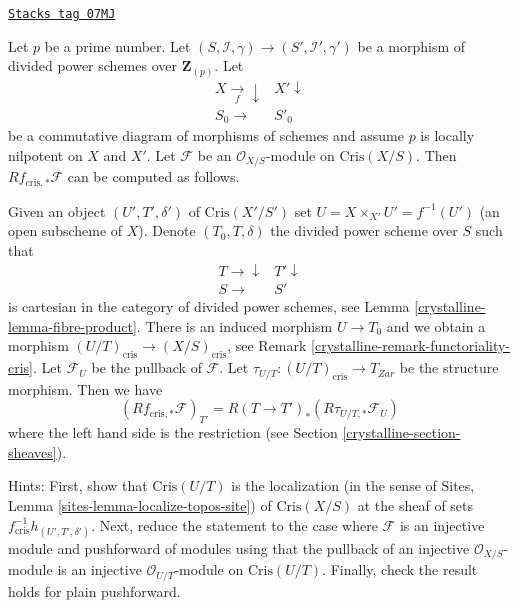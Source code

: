 \begin{remark}

\label{crystalline-remark-compute-direct-image}
\href{https://stacks.math.columbia.edu/tag/07MJ}{\texttt{Stacks tag 07MJ}}

Let $p$ be a prime number. Let
$(S, \mathcal{I}, \gamma) \to (S', \mathcal{I}', \gamma')$ be
a morphism of divided power schemes over $\mathbf{Z}_{(p)}$. Let
$$
\begin{array}{cc}X \underset{f}{\longrightarrow}\downarrow & X' \downarrow \\ S_0 \longrightarrow & S'_0\end{array}
$$
be a commutative diagram of morphisms of schemes and assume $p$ is
locally nilpotent on $X$ and $X'$. Let $\mathcal{F}$ be an
$\mathcal{O}_{X/S}$-module on $\text{Cris}(X/S)$. Then
$Rf_{\text{cris}, *}\mathcal{F}$ can be computed as follows.

\medskip\noindent
Given an object $(U', T', \delta')$ of $\text{Cris}(X'/S')$ set
$U = X \times_{X'} U' = f^{-1}(U')$ (an open subscheme of $X$). Denote
$(T_0, T, \delta)$ the divided power scheme over $S$ such that
$$
\begin{array}{cc}T \longrightarrow\downarrow & T' \downarrow \\ S \longrightarrow & S'\end{array}
$$
is cartesian in the category of divided power schemes, see
Lemma \ref{crystalline-lemma-fibre-product}. There is an
induced morphism $U \to T_0$ and we obtain a morphism
$(U/T)_{\text{cris}} \to (X/S)_{\text{cris}}$, see
Remark \ref{crystalline-remark-functoriality-cris}.
Let $\mathcal{F}_U$ be the pullback of $\mathcal{F}$.
Let $\tau_{U/T} : (U/T)_{\text{cris}} \to T_{Zar}$ be the structure morphism.
Then we have
\begin{equation}
\label{equation-identify-pushforward}
\left(Rf_{\text{cris}, *}\mathcal{F}\right)_{T'} =
R(T \to T')_*\left(R\tau_{U/T, *} \mathcal{F}_U \right)
\end{equation}
where the left hand side is the restriction (see
Section \ref{crystalline-section-sheaves}).

\medskip\noindent
Hints: First, show that $\text{Cris}(U/T)$ is the localization (in the sense
of Sites, Lemma \ref{sites-lemma-localize-topos-site}) of $\text{Cris}(X/S)$
at the sheaf of sets $f_{\text{cris}}^{-1}h_{(U', T', \delta')}$. Next, reduce
the statement to the case where $\mathcal{F}$ is an injective module
and pushforward of modules using that the pullback of an injective
$\mathcal{O}_{X/S}$-module is an injective $\mathcal{O}_{U/T}$-module on
$\text{Cris}(U/T)$. Finally, check the result holds for plain pushforward.
\end{remark}

